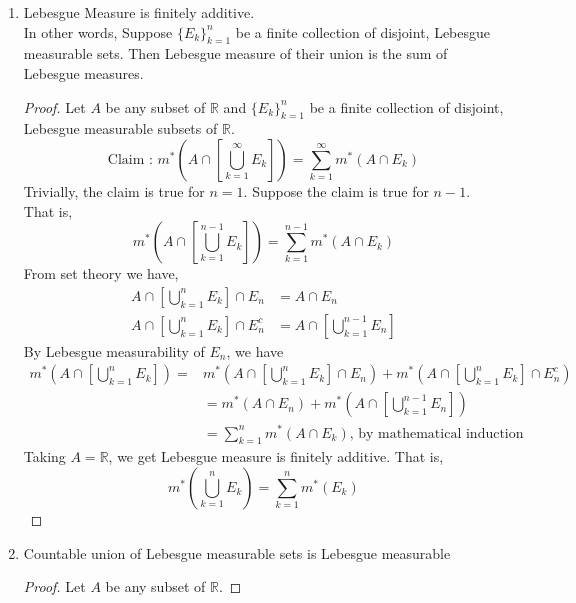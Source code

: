 \begin{enumerate}
	\item Lebesgue Measure is finitely additive.\\
		In other words, Suppose $\{E_k\}_{k = 1}^n$ be a finite collection of disjoint, Lebesgue measurable sets.
		Then Lebesgue measure of their union is the sum of Lebesgue measures.
	\begin{proof}
	Let $A$ be any subset of $\mathbb{R}$ and $\{ E_k \}_{k=1}^n$ be a finite collection of disjoint, Lebesgue measurable subsets of $\mathbb{R}$.
	\begin{equation}
		\text{Claim : }	m^\ast \left( A \cap \left[ \bigcup_{k=1}^\infty E_k\right] \right) = \sum_{k=1}^\infty m^\ast (A \cap E_k)
	\end{equation}
	Trivially, the claim is true for $n=1$.
		Suppose the claim is true for $n-1$.
		That is,
	\begin{equation}
		m^\ast \left( A \cap \left[ \bigcup_{k=1}^{n-1} E_k \right] \right) = \sum_{k=1}^{n-1} m^\ast (A \cap E_k)
	\end{equation}
	From set theory we have,
	\begin{align}
		A \cap \left[ \bigcup_{k=1}^n E_k \right] \cap E_n & = A \cap E_n\\
		A \cap \left[ \bigcup_{k=1}^n E_k \right] \cap E_n^c  & = A \cap \left[ \bigcup_{k=1}^{n-1} E_n \right]
	\end{align}
	By Lebesgue measurability of $E_n$, we have
	\begin{align*}
		m^\ast \left( A \cap \left[ \bigcup_{k=1}^n E_k \right] \right) = & m^\ast \left( A \cap \left[ \bigcup_{k=1}^n E_k \right] \cap E_n \right) + m^\ast \left( A \cap \left[ \bigcup_{k=1}^n E_k \right] \cap E_n^c \right)\\
		& = m^\ast \left( A \cap E_n \right) + m^\ast  \left( A \cap \left[ \bigcup_{k=1}^{n-1} E_n \right] \right) \\
		& =  \sum_{k=1}^n m^\ast \left( A \cap E_k \right) \text{, by mathematical induction}
	\end{align*}
	Taking $A = \mathbb{R}$, we get Lebesgue measure is finitely additive.
		That is,
	\begin{equation}
		m^\ast \left( \bigcup_{k=1}^n E_k \right) = \sum_{k=1}^n m^\ast \left( E_k \right)
	\end{equation}
	\end{proof}
\item Countable union of Lebesgue measurable sets is Lebesgue measurable
	\begin{proof}
		Let $A$ be any subset of $\mathbb{R}$.

\end{proof}
\end{enumerate}
